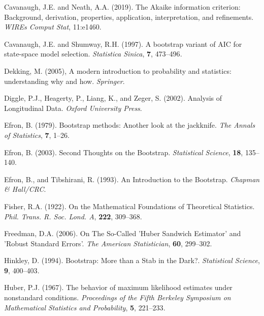 \phantom{a}

\rff Cavanaugh, J.E. and Neath, A.A. (2019).
      The Akaike information criterion: Background, derivation, properties, application, interpretation, and refinements.
      {\it WIREs Comput Stat},
      {11:e1460}.

\phantom{a}

\rff Cavanaugh, J.E. and Shumway, R.H. (1997).
      A bootstrap variant of AIC for state-space model selection.
      {\it Statistica Sinica},
      {\bf 7}, {473--496}.

\phantom{a}

\rff Dekking, M. (2005),
      A modern introduction to probability and statistics: understanding why and how.
      {\it Springer}.

\phantom{a}

\rff Diggle, P.J., Heagerty, P., Liang, K., and Zeger, S. (2002).
      Analysis of Longitudinal Data.
      {\it Oxford University Press}.

\phantom{a}

\rff Efron, B. (1979).
      Bootstrap methods: Another look at the jackknife.
      {\it The Annals of Statistics},
      {\bf 7}, {1--26}.

\phantom{a}

\rff Efron, B. (2003).
      Second Thoughts on the Bootstrap.
      {\it Statistical Science},
      {\bf 18}, {135--140}.

\phantom{a}

\rff Efron, B., and Tibshirani, R. (1993).
      An Introduction to the Bootstrap.
      {\it Chapman \& Hall/CRC}.

\phantom{a}

\rff Fisher, R.A. (1922).
      On the Mathematical Foundations of Theoretical Statistics.
      {\it Phil. Trans. R. Soc. Lond. A},
      {\bf 222}, {309--368}.

\phantom{a}

\rff Freedman, D.A. (2006).
      On The So-Called 'Huber Sandwich Estimator' and 'Robust Standard Errors'.
      {\it The American Statistician},
      {\bf 60}, {299--302}.

\phantom{a}

\rff Hinkley, D. (1994).
      Bootstrap: More than a Stab in the Dark?.
      {\it Statistical Science},
      {\bf 9}, {400--403}.

\phantom{a}

\rff Huber, P.J. (1967).
    The behavior of maximum likelihood estimates under nonstandard conditions.
    {\it Proceedings of the Fifth Berkeley Symposium on Mathematical Statistics and Probability},
    {\bf 5}, {221--233}.

